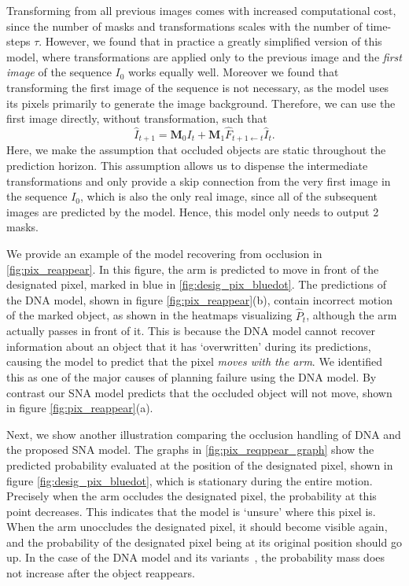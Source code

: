 Transforming from all previous images comes with increased computational cost, since the number of masks and transformations scales with the number of time-steps $\tau$. However, we found that in practice a greatly simplified version of this model, where transformations are applied only to the previous image and the \emph{first image} of the sequence $I_0$ works equally well. Moreover we found that transforming the first image of the sequence is not necessary, as the model uses its pixels primarily to generate the image background. Therefore, we can use the first image directly, without transformation, such that
\begin{equation}
\hat{I}_{t+1} = \mathbf{M}_{0} I_t +  \mathbf{M}_{1} \hat{F}_{t+1 \leftarrow t} \hat{I}_t.
\label{eqn:simplemodel}
\end{equation}
Here, we make the assumption that occluded objects are static throughout the prediction horizon. This assumption allows us to dispense the intermediate transformations and only provide a skip connection from the very first image in the sequence $I_0$, which is also the only real image, since all of the subsequent images are predicted by the model. Hence, this model only needs to output 2 masks. 

We provide an example of the model recovering from occlusion in \autoref{fig:pix_reappear}. In this figure, the arm is predicted to move in front of the designated pixel, marked in blue in \autoref{fig:desig_pix_bluedot}. The predictions of the DNA model, shown in figure \autoref{fig:pix_reappear}(b), contain incorrect motion of the marked object, as shown in the heatmaps visualizing $\hat{P}_t$, although the arm actually passes in front of it. This is because the DNA model cannot recover information about an object that it has `overwritten' during its predictions, causing the model to predict that the pixel \emph{moves with the arm}. We identified this as one of the major causes of planning failure using the DNA model. By contrast our SNA model predicts that the occluded object will not move, shown in figure  \autoref{fig:pix_reappear}(a).

Next, we show another illustration comparing the occlusion handling of DNA and the proposed SNA model. The graphs in \autoref{fig:pix_reqppear_graph} show the predicted probability evaluated at the position of the designated pixel, shown in figure \ref{fig:desig_pix_bluedot}, which is stationary during the entire motion. Precisely when the arm occludes the designated pixel, the probability at this point decreases. This indicates that the model is `unsure' where this pixel is. When the arm unoccludes the designated pixel, it should become visible again, and the probability of the designated pixel being at its original position should go up. In the case of the DNA model and its variants~\cite{finn_nips}, the probability mass does not increase after the object reappears. 
 
